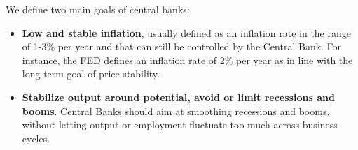 \documentclass[11pt,a4paper,oneside]{book}
\begin{document}

We define two main goals of central banks:
\begin{itemize}
  \item \textbf{Low and stable inflation}, usually defined as an inflation rate in the range of 1-3\% per year and that can still be controlled by the Central Bank. For instance, the FED defines an inflation rate of 2\% per year as in line with the long-term goal of price stability.
  \item \textbf{Stabilize output around potential, avoid or limit recessions and booms}. Central Banks should aim at smoothing recessions and booms, without letting output or employment fluctuate too much across business cycles.
\end{itemize}
\end{document}
